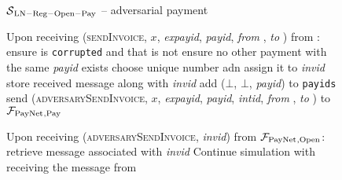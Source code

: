 \begin{figure}[!htbp]
  \begin{simulatorbox}{$\mathcal{S}{}_{\mathrm{LN - Reg - Open - Pay}}$ --
  adversarial payment}
    \begin{algorithmic}[1]
      \State Upon receiving (\textsc{sendInvoice}, $x$,
      \textit{expayid}, \textit{payid}, \textit{from} \alice, \textit{to} \bob)
      from \adversary:
      \Indent
      \label{alg:sim:pay:adv:invoice}
        \State ensure \alice{} is \texttt{corrupted} and that \bob{} is not
        \State ensure no other payment with the same \textit{payid} exists
        \State choose unique number adn assign it to \textit{invid}
        \State store received message along with \textit{invid}
        \State add ($\bot$, $\bot$, \textit{payid}) to \texttt{payids}
        \State send (\textsc{adversarySendInvoice}, $x$, \textit{expayid},
        \textit{payid}, \textit{intid}, \textit{from} \alice, \textit{to} \bob)
        to $\mathcal{F}_{\mathrm{PayNet}}{}_{\mathrm{, Pay}}$
        \label{alg:sim:pay:adv:invoice:send}
      \EndIndent
      \Statex

      \State Upon receiving (\textsc{adversarySendInvoice},
      \textit{invid}) from $\mathcal{F}_{\mathrm{PayNet}}{}_{\mathrm{, Open}}$:
      \label{alg:sim:pay:adv:invoice:recv}
      \Indent
        \State retrieve message associated with \textit{invid}
        \State Continue simulation with \alice{} receiving the message from \bob
        \label{alg:sim:pay:adv:invoice:cont}
      \EndIndent
    \end{algorithmic}
  \end{simulatorbox}
  \caption{}
  \label{alg:sim:pay:adv}
\end{figure}

